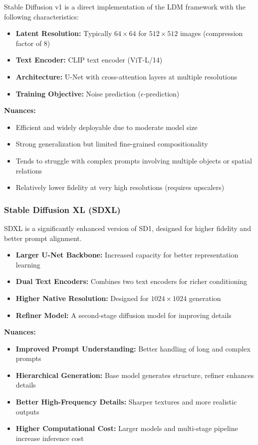 Stable Diffusion v1 is a direct implementation of the LDM framework with the following characteristics:

\begin{itemize}
    \item \textbf{Latent Resolution:} Typically $64 \times 64$ for $512 \times 512$ images (compression factor of 8)
    \item \textbf{Text Encoder:} CLIP text encoder (ViT-L/14)
    \item \textbf{Architecture:} U-Net with cross-attention layers at multiple resolutions
    \item \textbf{Training Objective:} Noise prediction ($\epsilon$-prediction)
\end{itemize}

\vspace{0.5em}
\noindent
\textbf{Nuances:}
\begin{itemize}
    \item Efficient and widely deployable due to moderate model size
    \item Strong generalization but limited fine-grained compositionality
    \item Tends to struggle with complex prompts involving multiple objects or spatial relations
    \item Relatively lower fidelity at very high resolutions (requires upscalers)
\end{itemize}

\subsubsection{Stable Diffusion XL (SDXL)}

SDXL is a significantly enhanced version of SD1, designed for higher fidelity and better prompt alignment.

\begin{itemize}
    \item \textbf{Larger U-Net Backbone:} Increased capacity for better representation learning
    \item \textbf{Dual Text Encoders:} Combines two text encoders for richer conditioning
    \item \textbf{Higher Native Resolution:} Designed for $1024 \times 1024$ generation
    \item \textbf{Refiner Model:} A second-stage diffusion model for improving details
\end{itemize}

\vspace{0.5em}
\noindent
\textbf{Nuances:}
\begin{itemize}
    \item \textbf{Improved Prompt Understanding:} Better handling of long and complex prompts
    \item \textbf{Hierarchical Generation:} Base model generates structure, refiner enhances details
    \item \textbf{Better High-Frequency Details:} Sharper textures and more realistic outputs
    \item \textbf{Higher Computational Cost:} Larger models and multi-stage pipeline increase inference cost
\end{itemize}


